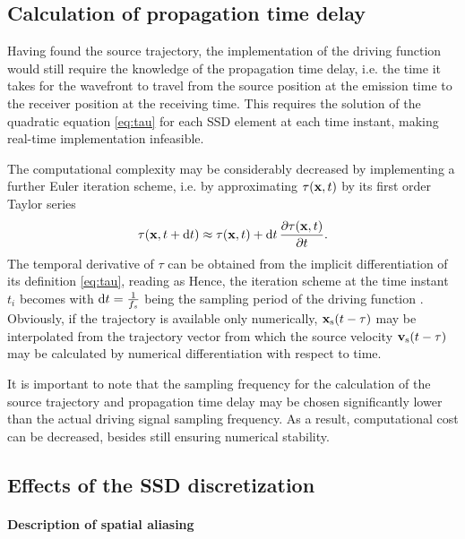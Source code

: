 \subsection{Calculation of propagation time delay}
	
Having found the source trajectory, the implementation of the driving function would still require the knowledge of the propagation time delay, i.e. the time it takes for the wavefront to travel from the source position at the emission time to the receiver position at the receiving time.
This requires the solution of the quadratic equation \eqref{eq:tau} for each SSD element at each time instant, making real-time implementation infeasible.

The computational complexity may be considerably decreased by implementing a further Euler iteration scheme, i.e. by approximating $\tau(\mathbf{x},t)$ by its first order Taylor series
\begin{equation}
\tau(\mathbf{x},t+\mathrm{d} t) \approx \tau(\mathbf{x},t) + \mathrm{d} t \, \frac{\partial \tau(\mathbf{x},t)}{\partial t}.
\end{equation}
The temporal derivative of $\tau$ can be obtained from the implicit differentiation of its definition \eqref{eq:tau}, reading as
Hence, the iteration scheme at the time instant $t_i$ becomes
with $\mathrm{d} t = \frac{1}{f_s}$ being the sampling period of the driving function \cite{doi:10.1121/1.4996126}.
Obviously, if the trajectory is available only numerically, $\mathbf{x}_{\mathrm{s}}(t-\tau)$ may be interpolated from the trajectory vector from which the source velocity $\mathbf{v}_{\mathrm{s}}(t-\tau)$ may be calculated by numerical differentiation with respect to time.

It is important to note that the sampling frequency for the calculation of the source trajectory and propagation time delay may be chosen significantly lower than the actual driving signal sampling frequency.
As a result, computational cost can be decreased, besides still ensuring numerical stability. 

\subsection{Effects of the SSD discretization}

\paragraph{Description of spatial aliasing}


